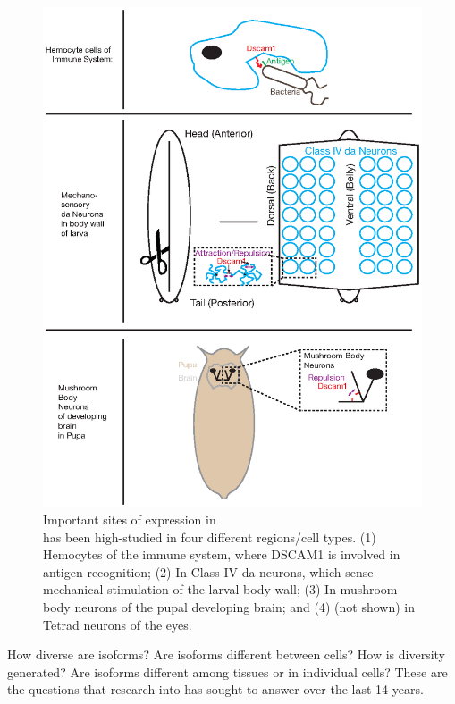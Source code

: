     \begin{figure} %
      \centering
      \includegraphics{Figures/Intro/DscamAnatomy.eps}
      \caption[Important sites of \dscam{} expression in \flies{}]
      {
        Important sites of \dscam{} expression in \flies{} \\[0.25cm]
        \dscam{} has been high-studied in four different regions/cell types. (1) Hemocytes of the immune system, where DSCAM1 is involved in antigen recognition; (2) In Class IV da neurons, which sense mechanical stimulation of the larval body wall; (3) In mushroom body neurons of the pupal developing brain; and (4) (not shown) in Tetrad neurons of the eyes.
        }
      \label{Intro:fig:DscamAnatomy}
      \end{figure}

    How diverse are \dscam{} isoforms? Are isoforms different between cells? How is diversity generated? Are isoforms different among tissues or in individual cells? These are the questions that research into \dscam{} has sought to answer over the last 14 years.

